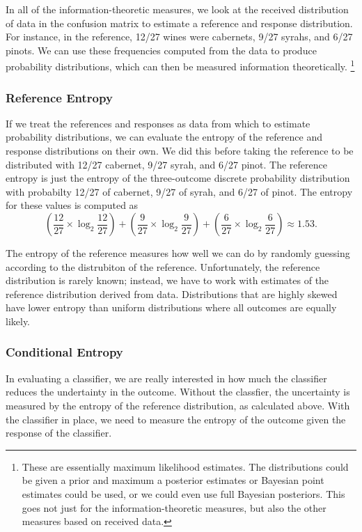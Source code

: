 In all of the information-theoretic measures, we look at the received
distribution of data in the confusion matrix to estimate a reference
and response distribution.  For instance, in the reference, 12/27
wines were cabernets, 9/27 syrahs, and 6/27 pinots.  We can use these
frequencies computed from the data to produce probability
distributions, which can then be measured information theoretically.%
%
\footnote{These are essentially maximum likelihood estimates.  The
  distributions could be given a prior and maximum a posterior
  estimates or Bayesian point estimates could be used, or we could
  even use full Bayesian posteriors.  This goes not just for the
  information-theoretic measures, but also the other measures based on
  received data.}


\subsubsection{Reference Entropy}

If we treat the references and responses as data from which to
estimate probability distributions, we can evaluate the entropy of the
reference and response distributions on their own.  We did this before
taking the reference to be distributed with 12/27 cabernet, 9/27
syrah, and 6/27 pinot.  The reference entropy is just the entropy of
the three-outcome discrete probability distribution with probabilty
12/27 of cabernet, 9/27 of syrah, and 6/27 of pinot.  The entropy for
these values is computed as
%
\begin{equation}
\left( \frac{12}{27} \times \log_2 \frac{12}{27} \right)
+ \left( \frac{9}{27} \times \log_2 \frac{9}{27} \right)
+ \left( \frac{6}{27} \times \log_2 \frac{6}{27} \right)
\approx 1.53.
\end{equation}

The entropy of the reference measures how well we can do by randomly
guessing according to the distrubiton of the reference.
Unfortunately, the reference distribution is rarely known; instead, we
have to work with estimates of the reference distribution derived from
data.  Distributions that are highly skewed have lower entropy than
uniform distributions where all outcomes are equally likely.

\subsubsection{Conditional Entropy}

In evaluating a classifier, we are really interested in how much the
classifier reduces the undertainty in the outcome.  Without the classfier,
the uncertainty is measured by the entropy of the reference distribution,
as calculated above.  With the classifier in place, we need to measure
the entropy of the outcome given the response of the classifier.  


